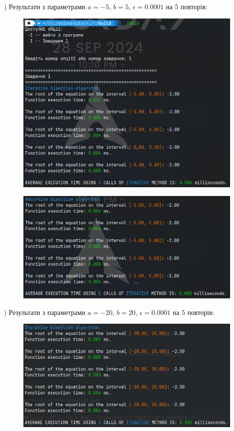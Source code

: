 \clearpage
{}) Результати з параметрами \(a = -5\), \(b = 5\), \(\epsilon = 0.0001\) на 5 повторів:
\begin{figure}[h]
    \centering
    \includegraphics[width=14cm]{reports/algos/lab2/assets/2.png}
\end{figure}

\begin{figure}[h]
    \centering
    \includegraphics[width=14cm]{reports/algos/lab2/assets/3.png}
\end{figure}

\clearpage
{}) Результати з параметрами \(a = -20\), \(b = 20\), \(\epsilon = 0.0001\) на 5 повторів:
\begin{figure}[h]
    \centering
    \includegraphics[width=14cm]{reports/algos/lab2/assets/4.png}
\end{figure}

